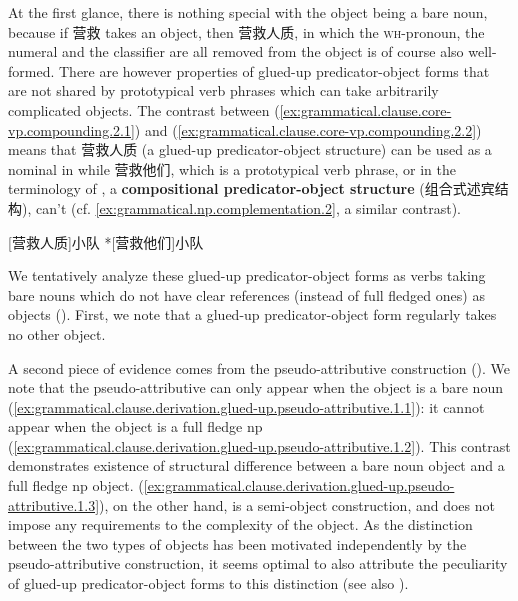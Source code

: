 \documentclass[UTF8, a4paper, oneside, scheme=plain, 12pt]{ctexrep}
\newcommand*{\citepages}[1]{pp.~{#1}}
\newcommand*{\concept}[1]{\textbf{#1}}
\newcommand*{\category}[1]{\textsc{#1}}
\begin{document}
At the first glance, there is nothing special with the object being a bare noun,
because if 营救 takes an object,
then 营救人质, in which the \category{wh}-pronoun, the numeral and the classifier
are all removed from the object is of course also well-formed.
There are however properties of glued-up predicator-object forms that are not shared by
prototypical verb phrases which can take arbitrarily complicated objects.
The contrast between (\ref{ex:grammatical.clause.core-vp.compounding.2.1})
and (\ref{ex:grammatical.clause.core-vp.compounding.2.2}) means that 
营救人质 (a glued-up predicator-object structure) can be used as a nominal in 
while 营救他们, which is a prototypical verb phrase, or in the terminology of \citet[\citepages{128-9}]{zhudexigrammar},
a \concept{compositional predicator-object structure} (组合式述宾结构), can't 
(cf. \ref{ex:grammatical.np.complementation.2}, a similar contrast).

\begin{exe}
    \ex\label{ex:grammatical.clause.core-vp.compounding.2}
    \begin{xlist}
        \ex\label{ex:grammatical.clause.core-vp.compounding.2.1} {} [营救人质]小队
        \ex\label{ex:grammatical.clause.core-vp.compounding.2.2} {} *[营救他们]小队
    \end{xlist}
\end{exe}

We tentatively analyze these glued-up predicator-object forms as 
verbs taking bare nouns which do not have clear references (instead of full fledged ones) as objects
().
First, we note that a glued-up predicator-object form regularly takes no other object.

A second piece of evidence comes from the pseudo-attributive construction
().
We note that the pseudo-attributive can only appear
when the object is a bare noun 
(\ref{ex:grammatical.clause.derivation.glued-up.pseudo-attributive.1.1}):
it cannot appear when the object is a full fledge \ac{np}
(\ref{ex:grammatical.clause.derivation.glued-up.pseudo-attributive.1.2}).
This contrast demonstrates existence of structural difference
between a bare noun object and a full fledge \ac{np} object.
(\ref{ex:grammatical.clause.derivation.glued-up.pseudo-attributive.1.3}),
on the other hand, is a semi-object construction,
and does not impose any requirements to the complexity of the object.
As the distinction between the two types of objects has been motivated independently by the pseudo-attributive construction,
it seems optimal to also attribute the peculiarity of glued-up predicator-object forms to this distinction
(see also ).
\end{document}
